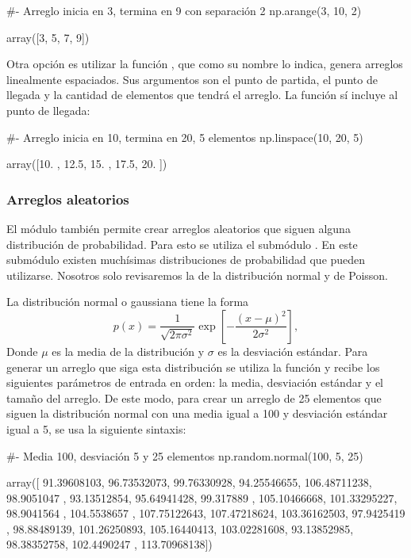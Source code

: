 \begin{pyin}[]
#- Arreglo inicia en 3, termina en 9 con separación 2
np.arange(3, 10, 2)
\end{pyin}
\begin{pyout}
array([3, 5, 7, 9])
\end{pyout}

Otra opción es utilizar la función , que como su nombre lo indica, genera arreglos linealmente espaciados. Sus argumentos son el punto de partida, el punto de llegada y la cantidad de elementos que tendrá el arreglo. La función  sí incluye al punto de llegada:

\begin{pyin}[]
#- Arreglo inicia en 10, termina en 20, 5 elementos
np.linspace(10, 20, 5)
\end{pyin}
\begin{pyout}
array([10. , 12.5, 15. , 17.5, 20. ])
\end{pyout}

\subsubsection{Arreglos aleatorios}
El módulo  también permite crear arreglos aleatorios que siguen alguna distribución de probabilidad. Para esto se utiliza el submódulo . En este submódulo existen muchísimas distribuciones de probabilidad que pueden utilizarse. Nosotros solo revisaremos la de la distribución normal y de Poisson.

La distribución normal o gaussiana tiene la forma
\[ p(x) = \frac{1}{\sqrt{2\pi\sigma^2}}\exp\left[-\frac{(x-\mu)^2}{2\sigma^2}\right], \]
Donde $\mu$ es la media de la distribución y $\sigma$ es la desviación estándar. Para generar un arreglo que siga esta distribución se utiliza la función  y recibe los siguientes parámetros de entrada en orden: la media, desviación estándar y el tamaño del arreglo. De este modo, para crear un arreglo de 25 elementos que siguen la distribución normal con una media igual a 100 y desviación estándar igual a 5, se usa la siguiente sintaxis:
\begin{pyin}[]
#- Media 100, desviación 5 y 25 elementos
np.random.normal(100, 5, 25) 
\end{pyin}
\begin{pyout}
array([ 91.39608103,  96.73532073,  99.76330928,  94.25546655,
       106.48711238,  98.9051047 ,  93.13512854,  95.64941428,
        99.317889  , 105.10466668, 101.33295227,  98.9041564 ,
       104.5538657 , 107.75122643, 107.47218624, 103.36162503,
        97.9425419 ,  98.88489139, 101.26250893, 105.16440413,
       103.02281608,  93.13852985,  98.38352758, 102.4490247 ,
       113.70968138])

\end{pyout}

